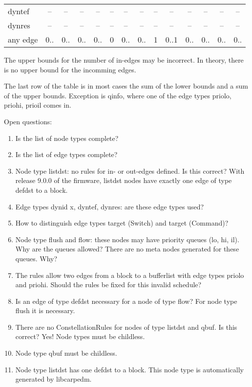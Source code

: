 \begin{table}
\begin{adjustwidth}{-21mm}{}
\begin{tabular}[t]{|L|c|c|c|c|c|c|c|c|c|c|c|c|c|}
dyntef            & --         & --              & --         & --         & --           & --         & --          & --        & --         & --               & --          & --         & --       \\
dynres            & --         & --              & --         & --         & --           & --         & --          & --        & --         & --               & --          & --         & --       \\
any edge          & 0..        & 0..             & 0..        & 0..        & 0            & 0..        & 0..         & 1         & 0..1       & 0..              & 0..         & 0..        & 0..      \\
\hline
\end{tabular}
\end{adjustwidth}
The upper bounds for the number of in-edges may be incorrect. In theory, there is no upper bound for the incomming edges.

The last row of the table is in most cases the sum of the lower bounds and a sum of the upper bounds. Exception is qinfo, where one of the edge types priolo, priohi, prioil comes in.
\end{table}

Open questions:
\begin{enumerate}
\item Is the list of node types complete?
\item Is the list of edge types complete?
\item Node type listdst: no rules for in- or out-edges defined. Is this correct? With release 9.0.0 of the firmware,
listdst nodes have exactly one edge of type defdst to a block.
\item Edge types dynid x, dyntef, dynres: are these edge types used?
\item How to distinguish edge types target (Switch) and target (Command)?
\item Node type flush and flow: these nodes may have priority queues (lo, hi, il). Why are the queues allowed?
There are no meta nodes generated for these queues. Why?
\item The rules allow two edges from a block to a bufferlist with edge types priolo and priohi.
Should the rules be fixed for this invalid schedule?
\item Is an edge of type defdst necessary for a node of type flow? For node type flush it is necessary.
\item There are no ConstellationRules for nodes of type listdst and qbuf. Is this correct? Yes! Node types must be childless.
\item Node type qbuf must be childless.
\item Node type listdst has one defdst to a block. This node type is automatically generated by libcarpedm.
\end{enumerate}
